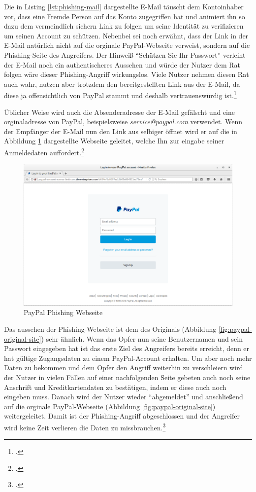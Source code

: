 Die in Listing \ref{lst:phishing-mail} dargestellte E-Mail täuscht dem Kontoinhaber vor, dass eine Fremde Person auf das Konto zugegriffen hat und animiert ihn so dazu dem vermeindlich sichern Link zu folgen um seine Identität zu verifizieren um seinen Account zu schützen. Nebenbei sei noch erwähnt, dass der Link in der E-Mail natürlich nicht auf die orginale PayPal-Webseite verweist, sondern auf die Phishing-Seite des Angreifers. Der Hinweiß \enquote{Schützen Sie Ihr Passwort} verleiht der E-Mail noch ein authentischeres Aussehen und würde der Nutzer dem Rat folgen wäre dieser Phishing-Angriff wirkungslos. Viele Nutzer nehmen diesen Rat auch wahr, nutzen aber trotzdem den bereitgestellten Link aus der E-Mail, da diese ja offensichtlich von PayPal stammt und deshalb vertrauenswürdig ist.\footcite[Vgl.][10]{phishing}

Üblicher Weise wird auch die Absenderadresse der E-Mail gefälscht und eine orginaladresse von PayPal, beispielsweise \textit{service@paypal.com} verwendet. Wenn der Empfänger der E-Mail nun den Link aus selbiger öffnet wird er auf die in Abbildung \ref{fig:paypal-phishing-site} dargestellte Webseite geleitet, welche Ihn zur eingabe seiner Anmeldedaten auffordert.\footcite[Vgl.][10]{phishing}

\begin{figure}[H]
  \centering
  \includegraphics[width=15cm]{images/paypal-phishing-site}
  \caption{PayPal Phishing Webseite}
  \label{fig:paypal-phishing-site}
\end{figure}

Das aussehen der Phishing-Webseite ist dem des Originals (Abbildung \ref{fig:paypal-original-site}) sehr ähnlich. Wenn das Opfer nun seine Benutzernamen und sein Passwort eingegeben hat ist das erste Ziel des Angreifers bereits erreicht, denn er hat gültige Zugangsdaten zu einem PayPal-Account erhalten. Um aber noch mehr Daten zu bekommen und dem Opfer den Angriff weiterhin zu verschleiern wird der Nutzer in vielen Fällen auf einer nachfolgenden Seite gebeten auch noch seine Anschrift und Kreditkartendaten zu bestätigen, indem er diese auch noch eingeben muss. Danach wird der Nutzer wieder \enquote{abgemeldet} und anschließend auf die orginale PayPal-Webseite (Abbildung \ref{fig:paypal-original-site}) weitergeleitet. Damit ist der Phishing-Angriff abgeschlossen und der Angreifer wird keine Zeit verlieren die Daten zu missbrauchen.\footcite[Vgl.][10\psqq]{phishing}


